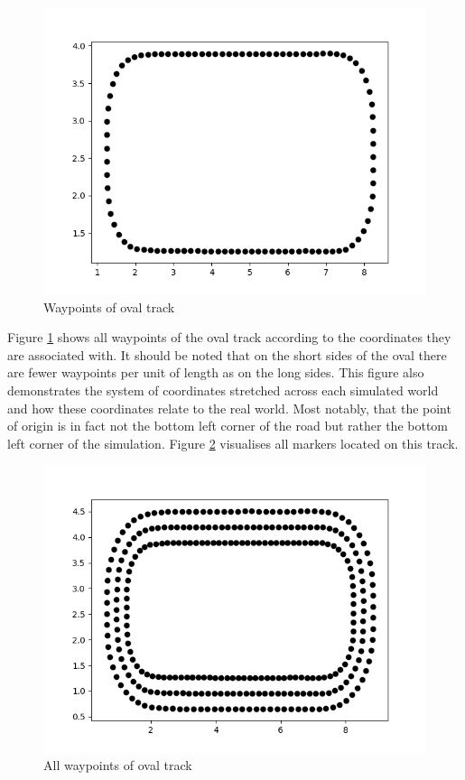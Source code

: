 \begin{figure}
    \centering
    \includegraphics[width=.85\textwidth]{images/oval_track_waypoints2.png}
    \caption{Waypoints of oval track}
    \label{fig:waypoints_oval}
\end{figure}

Figure \ref{fig:waypoints_oval} shows all waypoints of the oval track according to the coordinates they are associated with. It should be noted that on the short sides of the oval there are fewer waypoints per unit of length as on the long sides. This figure also demonstrates the system of coordinates stretched across each simulated world and how these coordinates relate to the real world. Most notably, that the point of origin is in fact not the bottom left corner of the road but rather the bottom left corner of the simulation. Figure \ref{fig:waypoints_oval_all} visualises all markers located on this track.

\begin{figure}
    \centering
    \includegraphics[width=.85\textwidth]{images/oval_track_waypoints_all.png}
    \caption{All waypoints of oval track}
    \label{fig:waypoints_oval_all}
\end{figure}

